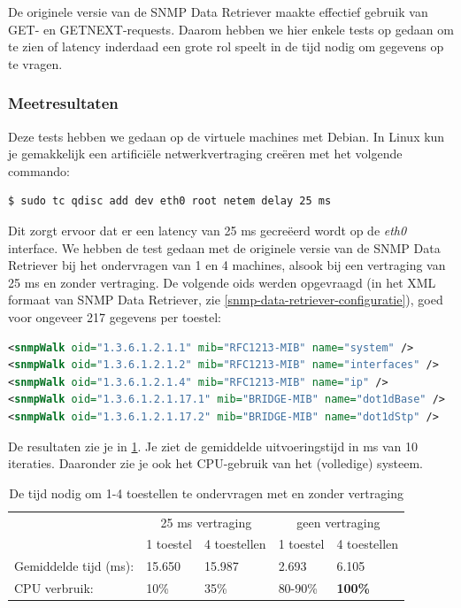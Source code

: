 De originele versie van de SNMP Data Retriever maakte effectief gebruik van GET- en GETNEXT-requests.
Daarom hebben we hier enkele tests op gedaan om te zien of latency inderdaad een grote rol speelt in de tijd nodig om gegevens op te vragen.

\subsubsection{Meetresultaten}

Deze tests hebben we gedaan op de virtuele machines met Debian.
In Linux kun je gemakkelijk een artificiële netwerkvertraging creëren met het volgende commando:

\begin{lstlisting}[language=bash, caption={Artificiële netwerkvertraging van 25ms op de eth0 interface}]
$ sudo tc qdisc add dev eth0 root netem delay 25 ms
\end{lstlisting}

Dit zorgt ervoor dat er een latency van 25 ms gecreëerd wordt op de \textit{eth0} interface.
We hebben de test gedaan met de originele versie van de SNMP Data Retriever bij het ondervragen van 1 en 4 machines,
alsook bij een vertraging van 25 ms en zonder vertraging.
De volgende \glspl{oid} werden opgevraagd (in het XML formaat van SNMP Data Retriever, zie \cref{snmp-data-retriever-configuratie}),
goed voor ongeveer 217 gegevens per toestel:

\begin{lstlisting}[language=xml]
<snmpWalk oid="1.3.6.1.2.1.1" mib="RFC1213-MIB" name="system" />
<snmpWalk oid="1.3.6.1.2.1.2" mib="RFC1213-MIB" name="interfaces" />
<snmpWalk oid="1.3.6.1.2.1.4" mib="RFC1213-MIB" name="ip" />
<snmpWalk oid="1.3.6.1.2.1.17.1" mib="BRIDGE-MIB" name="dot1dBase" />
<snmpWalk oid="1.3.6.1.2.1.17.2" mib="BRIDGE-MIB" name="dot1dStp" />
\end{lstlisting}

De resultaten zie je in \cref{tabel-latency}.
Je ziet de gemiddelde uitvoeringstijd in ms van 10 iteraties.
Daaronder zie je ook het CPU-gebruik van het (volledige) systeem.

\begin{table}[h]
\centering
\begin{tabular}{@{}lllll@{}}
\toprule
                      & \multicolumn{2}{c}{25 ms vertraging} & \multicolumn{2}{c}{geen vertraging} \\
                      & 1 toestel       & 4 toestellen       & 1 toestel       & 4 toestellen      \\ \midrule
Gemiddelde tijd (ms): & 15.650          & 15.987             & 2.693           & 6.105             \\
CPU verbruik:         & 10\%            & 35\%               & 80-90\%         & \textbf{100\%}    \\ \bottomrule
\end{tabular}
\caption{De tijd nodig om 1-4 toestellen te ondervragen met en zonder vertraging}
\label{tabel-latency}
\end{table}

